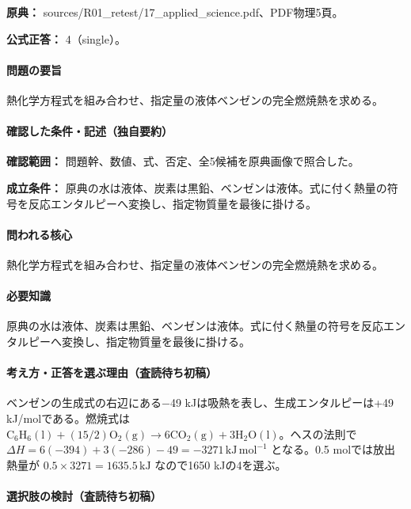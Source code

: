 \noindent\textbf{原典：} sources/R01\_retest/17\_applied\_science.pdf、PDF物理5頁。

\textbf{公式正答：} 4（single）。

\paragraph{問題の要旨} 熱化学方程式を組み合わせ、指定量の液体ベンゼンの完全燃焼熱を求める。

\paragraph{確認した条件・記述（独自要約）}\mbox{}\par

\noindent\textbf{確認範囲：} 問題幹、数値、式、否定、全5候補を原典画像で照合した。\par

\noindent\textbf{成立条件：} 原典の水は液体、炭素は黒鉛、ベンゼンは液体。式に付く熱量の符号を反応エンタルピーへ変換し、指定物質量を最後に掛ける。\par

\paragraph{問われる核心} 熱化学方程式を組み合わせ、指定量の液体ベンゼンの完全燃焼熱を求める。

\paragraph{必要知識} 原典の水は液体、炭素は黒鉛、ベンゼンは液体。式に付く熱量の符号を反応エンタルピーへ変換し、指定物質量を最後に掛ける。

\paragraph{考え方・正答を選ぶ理由（査読待ち初稿）} ベンゼンの生成式の右辺にある−49 kJは吸熱を表し、生成エンタルピーは+49 kJ/molである。燃焼式は \(\mathrm{C_6H_6(l)}+(15/2)\mathrm{O_2(g)}\to6\mathrm{CO_2(g)}+3\mathrm{H_2O(l)}\)。ヘスの法則で \(\Delta H=6(-394)+3(-286)-49=-3271\,\mathrm{kJ\,mol^{-1}}\) となる。0.5 molでは放出熱量が \(0.5\times3271=1635.5\,\mathrm{kJ}\) なので1650 kJの4を選ぶ。

\paragraph{選択肢の検討（査読待ち初稿）}\mbox{}\par


